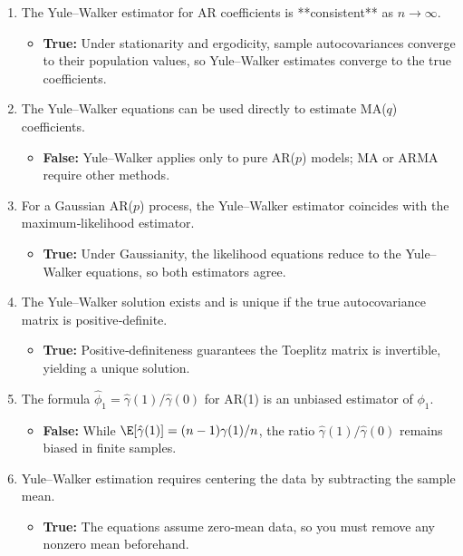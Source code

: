 \documentclass[11pt]{article}
\begin{document}
\begin{enumerate}
  \item The Yule–Walker estimator for AR coefficients is **consistent** as $n\to\infty$.
  \begin{itemize}
    \item \textbf{True:} Under stationarity and ergodicity, sample autocovariances converge to their population values, so Yule–Walker estimates converge to the true coefficients.
  \end{itemize}

  \item The Yule–Walker equations can be used directly to estimate MA($q$) coefficients.
  \begin{itemize}
    \item \textbf{False:} Yule–Walker applies only to pure AR($p$) models; MA or ARMA require other methods.
  \end{itemize}

  \item For a Gaussian AR($p$) process, the Yule–Walker estimator coincides with the maximum‐likelihood estimator.
  \begin{itemize}
    \item \textbf{True:} Under Gaussianity, the likelihood equations reduce to the Yule–Walker equations, so both estimators agree.
  \end{itemize}

  \item The Yule–Walker solution exists and is unique if the true autocovariance matrix is positive‐definite.
  \begin{itemize}
    \item \textbf{True:} Positive‐definiteness guarantees the Toeplitz matrix is invertible, yielding a unique solution.
  \end{itemize}

  \item The formula $\hat\phi_1 = \hat\gamma(1)/\hat\gamma(0)$ for AR(1) is an unbiased estimator of $\phi_1$.
  \begin{itemize}
    \item \textbf{False:} While $\E[\hat\gamma(1)] = (n-1)\gamma(1)/n$, the ratio $\hat\gamma(1)/\hat\gamma(0)$ remains biased in finite samples.
  \end{itemize}

  \item Yule–Walker estimation requires centering the data by subtracting the sample mean.
  \begin{itemize}
    \item \textbf{True:} The equations assume zero‐mean data, so you must remove any nonzero mean beforehand.
  \end{itemize}


\end{enumerate}
\end{document}
